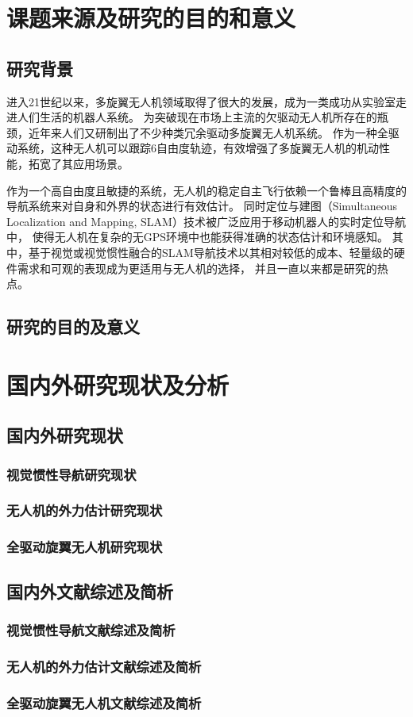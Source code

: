 \section{课题来源及研究的目的和意义}
\subsection{研究背景}
进入21世纪以来，多旋翼无人机领域取得了很大的发展，成为一类成功从实验室走进人们生活的机器人系统。
为突破现在市场上主流的欠驱动无人机所存在的瓶颈，近年来人们又研制出了不少种类冗余驱动多旋翼无人机系统。
作为一种全驱动系统，这种无人机可以跟踪6自由度轨迹，有效增强了多旋翼无人机的机动性能，拓宽了其应用场景。

作为一个高自由度且敏捷的系统，无人机的稳定自主飞行依赖一个鲁棒且高精度的导航系统来对自身和外界的状态进行有效估计。
同时定位与建图（Simultaneous Localization and Mapping, SLAM）技术被广泛应用于移动机器人的实时定位导航中，
使得无人机在复杂的无GPS环境中也能获得准确的状态估计和环境感知。
其中，基于视觉或视觉惯性融合的SLAM导航技术以其相对较低的成本、轻量级的硬件需求和可观的表现成为更适用与无人机的选择，
并且一直以来都是研究的热点。\cite{ding2021vid}
\subsection{研究的目的及意义}
\section{国内外研究现状及分析}
\subsection{国内外研究现状}
\subsubsection{视觉惯性导航研究现状}
\subsubsection{无人机的外力估计研究现状}
\subsubsection{全驱动旋翼无人机研究现状}
\subsection{国内外文献综述及简析}
\subsubsection{视觉惯性导航文献综述及简析}
\subsubsection{无人机的外力估计文献综述及简析}
\subsubsection{全驱动旋翼无人机文献综述及简析}

